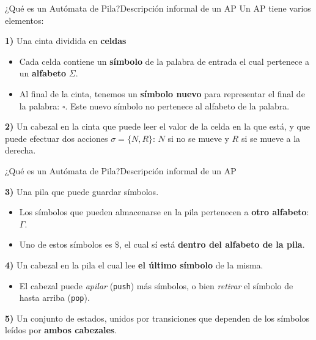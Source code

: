 \documentclass[spanish]{beamer}
\begin{document}
\begin{frame}{¿Qué es un Autómata de Pila?}{Descripción informal de un AP}
    Un AP tiene varios elementos:
    \bigskip

    \textbf{1)} Una \alert{cinta} dividida en \textbf{celdas} \pause
    
    \begin{itemize}
        \item Cada celda contiene un \textbf{símbolo} de la palabra de entrada el cual pertenece a un \textbf{alfabeto} $\Sigma$. \pause
        \item  Al final de la cinta, tenemos un \textbf{símbolo nuevo} para representar el \alert{final de la palabra}: $\square$. Este nuevo símbolo no pertenece al alfabeto de la palabra. \pause
    \end{itemize}

    \textbf{2)} Un \alert{cabezal en la cinta} que puede leer el valor de la celda en la que está, y que puede efectuar dos acciones $\sigma = \{N,R\}$: $N$ si no se mueve y $R$ si se mueve a la derecha. \pause

    \begin{center}
    \end{center}
\end{frame}

\begin{frame}{¿Qué es un Autómata de Pila?}{Descripción informal de un AP}

    \textbf{3)} Una \alert{pila} que puede guardar símbolos. \pause

    \begin{itemize}
        \item Los símbolos que pueden almacenarse en la pila pertenecen a \textbf{otro alfabeto}: $\Gamma$. \pause
        \item Uno de estos símbolos es $\$$, el cual sí está \textbf{dentro del alfabeto de la pila}. \pause
    \end{itemize}

    \bigskip

    \textbf{4)} Un \alert{cabezal en la pila} el cual lee \textbf{el último símbolo} de la misma. \pause

    \begin{itemize}
        \item El cabezal puede \textit{apilar} (\alert{\texttt{push}}) más símbolos, o bien \textit{retirar} el símbolo de hasta arriba (\alert{\texttt{pop}}). \pause
    \end{itemize}

    \bigskip

    \textbf{5)} Un conjunto de \alert{estados}, unidos por \alert{transiciones} que dependen de los símbolos leídos por \textbf{ambos cabezales}.

\end{frame}
\end{document}
